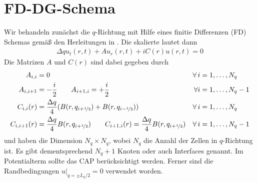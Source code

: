 \section{FD-DG-Schema}
\label{sec:FD-DG-Schema}
Wir behandeln zunächst die $q$-Richtung mit Hilfe eines finitie Differenzen (FD) Schemas gemäß den Herleitungen in \cite{lukas1}. Die skalierte \lvn lautet dann
\begin{align}
  \Delta q u_t(r,t) + A u_r(r,t) + iC(r)u(r,t) = 0
  \label{eq:FDschema}
\end{align}
Die Matrizen $A$ und $C(r)$ sind dabei gegeben durch
\begin{align*}
  A_{i,i} &= 0  &\forall \, i&=1,\dots,N_q \\
  A_{i,i+1} &= -\frac{i}{2}   \qquad  A_{i+1, i} = +\frac{i}{2} &\forall i&=1,\dots,N_q-1 \\
  C_{i,i}(r) &= \frac{\Delta q}{4} (B(r, q_{i+\nicefrac{1}{2}}) + B(r, q_{i-\nicefrac{1}{2}}))  &\forall \, i&=1,\dots,N_q \\
  C_{i,i+1}(r) &= \frac{\Delta q}{4} B(r, q_{i+\nicefrac{1}{2}}) \qquad C_{i+1,i}(r) = \frac{\Delta q}{4} B(r, q_{i+\nicefrac{1}{2}})  &\forall \, i&=1,\dots,N_q-1
\end{align*}
und haben die Dimension $N_q \times N_q$, wobei $N_q$ die Anzahl der Zellen in $q$-Richtung ist. Es gibt dementsprechend $N_q+1$ Knoten oder auch Interfaces genannt. Im Potentialterm sollte das CAP berücksichtigt werden. Ferner sind die Randbedingungen $u|_{q=\pm L_q/2} = 0$ verwendet worden.


